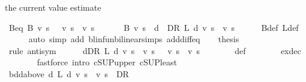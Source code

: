 \begin{isabellebody}
\begin{isamarkuptext}
  the current value estimate%
\end{isamarkuptext}\isamarkuptrue%
\isamarkupfalse%
\ B{\isacharunderscore}{\kern0pt}eq{\isacharunderscore}{\kern0pt}{\isasymL}{\isacharcolon}{\kern0pt}\ {\isachardoublequoteopen}B\ v\ s\ {\isacharequal}{\kern0pt}\ {\isasymL}\ v\ s\ {\isacharminus}{\kern0pt}\ v\ s{\isachardoublequoteclose}\isanewline
%
\isadelimproof
%
\endisadelimproof
%
\isatagproof
{}\isamarkupfalse%
\ {\isacharminus}{\kern0pt}\isanewline
\ \ \isamarkupfalse%
\ {\isacharasterisk}{\kern0pt}{\isacharcolon}{\kern0pt}\ {\isachardoublequoteopen}B\ v\ s\ {\isacharequal}{\kern0pt}\ {\isacharparenleft}{\kern0pt}{\isasymSqunion}d\ {\isasymin}\ D\isactrlsub R{\isachardot}{\kern0pt}\ L\ d\ v\ s\ {\isacharminus}{\kern0pt}\ v\ s{\isacharparenright}{\kern0pt}{\isachardoublequoteclose}\isanewline
\ \ \ \ \isamarkupfalse%
\ B{\isacharunderscore}{\kern0pt}def\ L{\isacharunderscore}{\kern0pt}def\isanewline
\ \ \ \ \isamarkupfalse%
\ {\isacharparenleft}{\kern0pt}auto\ simp\ add{\isacharcolon}{\kern0pt}\ blinfun{\isachardot}{\kern0pt}bilinear{\isacharunderscore}{\kern0pt}simps\ add{\isacharunderscore}{\kern0pt}diff{\isacharunderscore}{\kern0pt}eq{\isacharparenright}{\kern0pt}\isanewline
\ \ \isamarkupfalse%
\ {\isacharquery}{\kern0pt}thesis\isanewline
\ \ \ \ \isamarkupfalse%
\ {\isacharasterisk}{\kern0pt}\isanewline
\ \ \isamarkupfalse%
\ {\isacharparenleft}{\kern0pt}rule\ antisym{\isacharparenright}{\kern0pt}\isanewline
\ \ \ \ \isamarkupfalse%
\ {\isachardoublequoteopen}{\isacharparenleft}{\kern0pt}{\isasymSqunion}d{\isasymin}D\isactrlsub R{\isachardot}{\kern0pt}\ L\ d\ v\ s\ {\isacharminus}{\kern0pt}\ v\ s{\isacharparenright}{\kern0pt}\ {\isasymle}\ {\isasymL}\ v\ s\ {\isacharminus}{\kern0pt}\ v\ s{\isachardoublequoteclose}\isanewline
\ \ \ \ \ \ \isamarkupfalse%
\ {\isasymL}{\isacharunderscore}{\kern0pt}def\isanewline
\ \ \ \ \ \ \isamarkupfalse%
\ ex{\isacharunderscore}{\kern0pt}dec\isanewline
\ \ \ \ \ \ \isamarkupfalse%
\ {\isacharparenleft}{\kern0pt}fastforce\ intro{\isacharbang}{\kern0pt}{\isacharcolon}{\kern0pt}\ cSUP{\isacharunderscore}{\kern0pt}upper\ cSUP{\isacharunderscore}{\kern0pt}least{\isacharparenright}{\kern0pt}\isanewline
\ \ \isamarkupfalse%
\isanewline
\ \ \ \ \isamarkupfalse%
\ {\isachardoublequoteopen}bdd{\isacharunderscore}{\kern0pt}above\ {\isacharparenleft}{\kern0pt}{\isacharparenleft}{\kern0pt}{\isasymlambda}d{\isachardot}{\kern0pt}\ L\ d\ v\ s\ {\isacharminus}{\kern0pt}\ v\ s{\isacharparenright}{\kern0pt}\ {\isacharbackquote}{\kern0pt}\ D\isactrlsub R{\isacharparenright}{\kern0pt}{\isachardoublequoteclose}\isanewline

\end{isabellebody}

